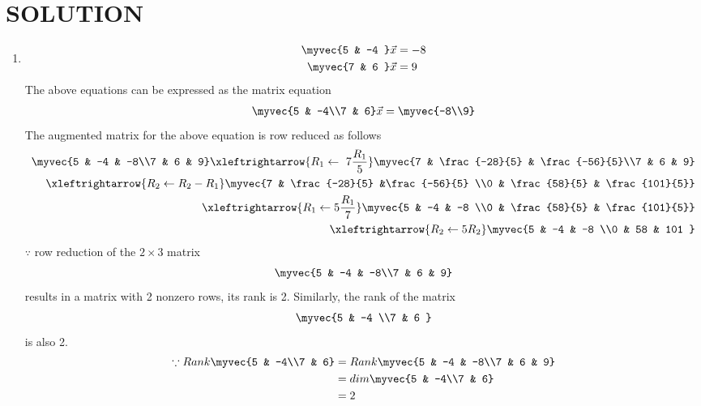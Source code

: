 \documentclass[journal,12pt,twocolumn]{IEEEtran}
\begin{document}
\section{SOLUTION}  
\begin{enumerate}
\item
\begin{align}
\begin{split}
\myvec{5 & -4 }\vec{x}&=-8
\\
\myvec{7 & 6 }\vec{x}&=9
\end{split}
\end{align}
The above equations can be expressed as the matrix equation
\begin{align}
\myvec{5 & -4\\7 & 6} \vec{x} = \myvec{-8\\9}
\end{align}
%
The augmented matrix for the above equation is row reduced as follows
\begin{align}
\myvec{5 & -4 & -8\\7 & 6 & 9} 
\xleftrightarrow {R_1\leftarrow \ 7\frac{R_1}{5}}\myvec{7 & \frac{-28}{5} & \frac{-56}{5}\\7 & 6 & 9} 
\\
\xleftrightarrow {R_2\leftarrow R_2 - R_1}\myvec{7 & \frac{-28}{5} &\frac{-56}{5} \\0 & \frac{58}{5} & \frac{101}{5}}
\\
\xleftrightarrow {R_1\leftarrow 5\frac{R_1}{7}}\myvec{5 & -4 & -8 \\0 & \frac{58}{5} & \frac{101}{5}}
\\
\xleftrightarrow {R_2\leftarrow 5R_2}\myvec{5 & -4 & -8 \\0 & 58 & 101 }
\end{align}
%
$\because$ row reduction of the $2\times 3$ matrix
%
\begin{align}
\myvec{5 & -4 & -8\\7 & 6 & 9} \label{2.0.7}
\end{align}
%
results in a matrix with 2 nonzero rows, its rank is 2. 
%
Similarly, the rank of the matrix 
\begin{align}
\myvec{5 & -4 \\7 & 6 } \label{2.0.8}
\end{align}
%
is also 2.
%
\begin{align}
\because Rank \myvec{5 & -4\\7 & 6} &= Rank\myvec{5 & -4 & -8\\7 & 6 & 9} \nonumber\\
 &=dim \myvec{5 & -4\\7 & 6}\nonumber\\
 &=2
\end{align}


\end{enumerate}
\end{document}
